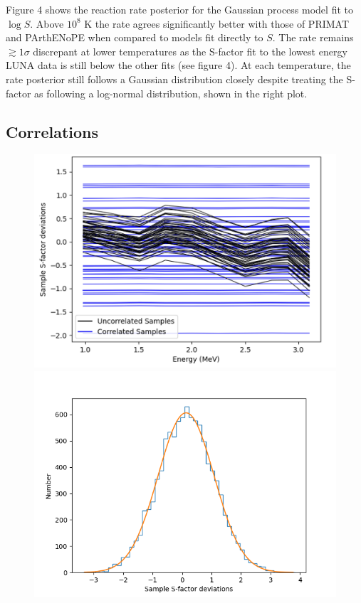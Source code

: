 \documentclass[%
 reprint,
superscriptaddress,
nofootinbib,
 amsmath,amssymb,
 aps,
 pra,
]{revtex4-2}
\begin{document}
Figure 4 shows the reaction rate posterior for the Gaussian process model fit to $\log S$. Above $10^8$ K the rate agrees significantly better with those of PRIMAT and PArthENoPE when compared to models fit directly to $S$. The rate remains $\gtrsim1\sigma$ discrepant at lower temperatures as the S-factor fit to the lowest energy LUNA data is still below the other fits (see figure 4). At each temperature, the rate posterior still follows a Gaussian distribution closely despite treating the S-factor as following a log-normal distribution, shown in the right plot. 

\subsection{Correlations}

\begin{figure}
	\begin{minipage}{.48\textwidth}
        		\centering
        		\includegraphics[width=\linewidth]{Figures/ddhe3n_correlations.png}
    	\end{minipage}
    	\hspace{0mm}
    	\begin{minipage}{.48\textwidth}
        		\centering
        		\includegraphics[width=\linewidth]{Figures/ddhe3n_correlation_hist.png}

\end{minipage}
\end{figure}
\end{document}
